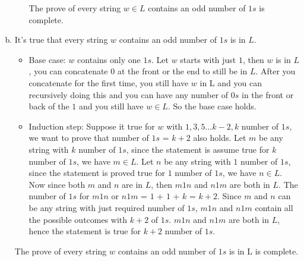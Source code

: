 \documentclass[11pt]{article}
\begin{document}
\begin{solution}
\begin{enumerate}[(a)]
\begin{itemize}
\begin{itemize}
\end{itemize}
    The prove of every string $w \in L$ contains an odd number of $1s$ is complete.
\end{itemize}
\item    
    It's true that every string $w$ contains an odd number of $1s$ is in $L$.
\begin{itemize}
\item
    Base case: $w$ contains only one $1s$. Let $w$ starts with just $1$, then $w$ is in $L$, you can concatenate $0$ at the front or the end to still be in $L$. After you concatenate for the first time, you still have $w$ in L and you can recursively doing this and you can have any number of $0s$ in the front or back of the $1$ and you still have $w \in L$. So the base case holds.
\item
    Induction step: Suppose it true for $w$ with $1,3,5...k-2,k$ number of $1s$, we want to prove that number of $1s$ = $k + 2$ also holds. Let $m$ be any string with $k$ number of $1s$, since the statement is assume true for $k$ number of $1s$, we have $m \in L$. Let $n$ be any string with $1$ number of $1s$, since the statement is proved true for $1$ number of $1s$, we have $n \in L$. Now since both $m$ and $n$ are in $L$, then $m1n$ and $n1m$ are both in $L$. The number of $1s$ for $m1n$ or $n1m$ = $1$ + $1$ + $k$ = $k+2$. Since $m$ and $n$ can be any string with just required number of $1s$, $m1n$ and $n1m$ contain all the possible outcomes with $k+2$ of $1s$. $m1n$ and $n1m$ are both in $L$, hence the statement is true for $k+2$ number of $1s$.
\end{itemize}
    The prove of every string $w$ contains an odd number of $1s$ is in L is complete.
\medskip
\end{enumerate}

\end{solution}
\end{document}
